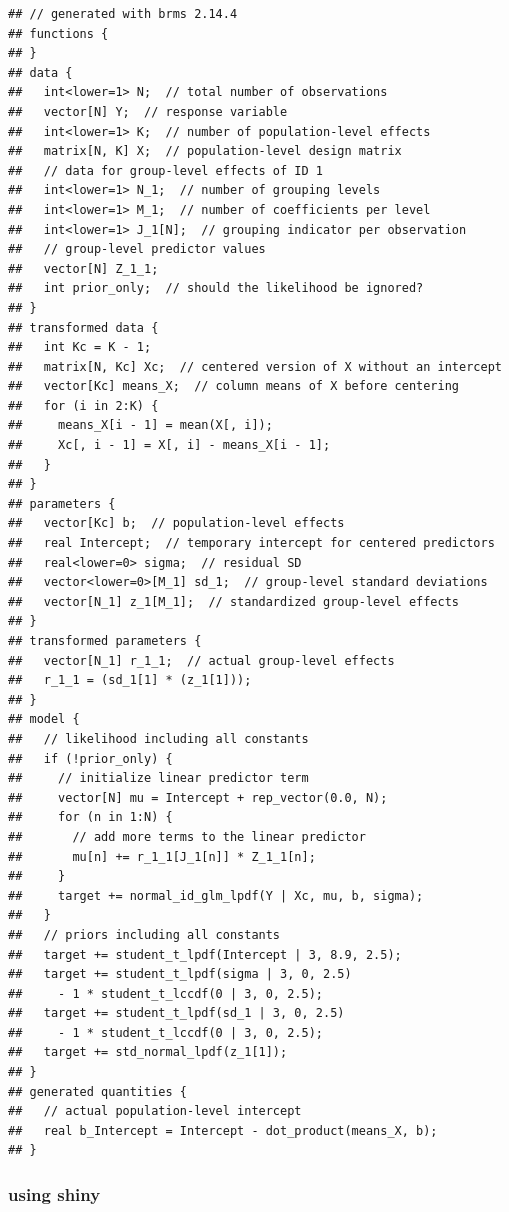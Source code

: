\documentclass[
  12pt,
]{book}
\begin{document}
\begin{verbatim}
## // generated with brms 2.14.4
## functions {
## }
## data {
##   int<lower=1> N;  // total number of observations
##   vector[N] Y;  // response variable
##   int<lower=1> K;  // number of population-level effects
##   matrix[N, K] X;  // population-level design matrix
##   // data for group-level effects of ID 1
##   int<lower=1> N_1;  // number of grouping levels
##   int<lower=1> M_1;  // number of coefficients per level
##   int<lower=1> J_1[N];  // grouping indicator per observation
##   // group-level predictor values
##   vector[N] Z_1_1;
##   int prior_only;  // should the likelihood be ignored?
## }
## transformed data {
##   int Kc = K - 1;
##   matrix[N, Kc] Xc;  // centered version of X without an intercept
##   vector[Kc] means_X;  // column means of X before centering
##   for (i in 2:K) {
##     means_X[i - 1] = mean(X[, i]);
##     Xc[, i - 1] = X[, i] - means_X[i - 1];
##   }
## }
## parameters {
##   vector[Kc] b;  // population-level effects
##   real Intercept;  // temporary intercept for centered predictors
##   real<lower=0> sigma;  // residual SD
##   vector<lower=0>[M_1] sd_1;  // group-level standard deviations
##   vector[N_1] z_1[M_1];  // standardized group-level effects
## }
## transformed parameters {
##   vector[N_1] r_1_1;  // actual group-level effects
##   r_1_1 = (sd_1[1] * (z_1[1]));
## }
## model {
##   // likelihood including all constants
##   if (!prior_only) {
##     // initialize linear predictor term
##     vector[N] mu = Intercept + rep_vector(0.0, N);
##     for (n in 1:N) {
##       // add more terms to the linear predictor
##       mu[n] += r_1_1[J_1[n]] * Z_1_1[n];
##     }
##     target += normal_id_glm_lpdf(Y | Xc, mu, b, sigma);
##   }
##   // priors including all constants
##   target += student_t_lpdf(Intercept | 3, 8.9, 2.5);
##   target += student_t_lpdf(sigma | 3, 0, 2.5)
##     - 1 * student_t_lccdf(0 | 3, 0, 2.5);
##   target += student_t_lpdf(sd_1 | 3, 0, 2.5)
##     - 1 * student_t_lccdf(0 | 3, 0, 2.5);
##   target += std_normal_lpdf(z_1[1]);
## }
## generated quantities {
##   // actual population-level intercept
##   real b_Intercept = Intercept - dot_product(means_X, b);
## }
\end{verbatim}

\hypertarget{using-shiny}{%
\subsubsection{using shiny}\label{using-shiny}}
\end{document}
